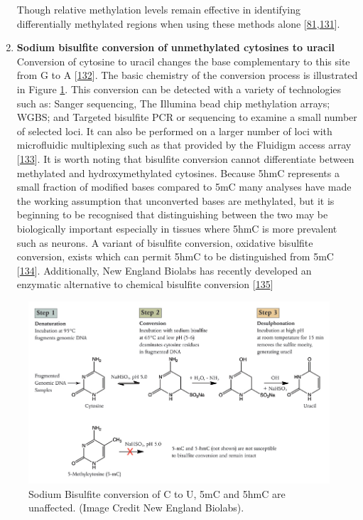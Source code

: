 \documentclass[
]{book}
\begin{document}
\begin{enumerate}
  Though relative methylation levels remain effective in identifying differentially methylated regions when using these methods alone {[}\protect\hyperlink{ref-Maunakea2010}{81},\protect\hyperlink{ref-Bock2010}{131}{]}.
\item
  \textbf{Sodium bisulfite conversion of unmethylated cytosines to uracil}
  Conversion of cytosine to uracil changes the base complementary to this site from G to A {[}\protect\hyperlink{ref-Hayatsu1970}{132}{]}.
  The basic chemistry of the conversion process is illustrated in Figure \ref{fig:BisulfiteConversionNEB}.
  This conversion can be detected with a variety of technologies such as:
  Sanger sequencing, The Illumina bead chip methylation arrays; WGBS; and Targeted bisulfite PCR or sequencing to examine a small number of selected loci.
  It can also be performed on a larger number of loci with microfluidic multiplexing such as that provided by the Fluidigm access array {[}\protect\hyperlink{ref-Adamowicz2018}{133}{]}.
  It is worth noting that bisulfite conversion cannot differentiate between methylated and hydroxymethylated cytosines.
  Because 5hmC represents a small fraction of modified bases compared to 5mC many analyses have made the working assumption that unconverted bases are methylated, but it is beginning to be recognised that distinguishing between the two may be biologically important especially in tissues where 5hmC is more prevalent such as neurons.
  A variant of bisulfite conversion, oxidative bisulfite conversion, exists which can permit 5hmC to be distinguished from 5mC {[}\protect\hyperlink{ref-Skvortsova2017}{134}{]}.
  Additionally, New England Biolabs has recently developed an enzymatic alternative to chemical bisulfite conversion {[}\protect\hyperlink{ref-Williams2019}{135}{]}
\end{enumerate}

\begin{figure}

{\centering \includegraphics[width=0.8\linewidth]{figs/BisulfiteConversionNEB} 

}

\caption{Sodium Bisulfite conversion of C to U, 5mC and 5hmC are unaffected. (Image Credit New England Biolabs).}\label{fig:BisulfiteConversionNEB}
\end{figure}
\end{document}
